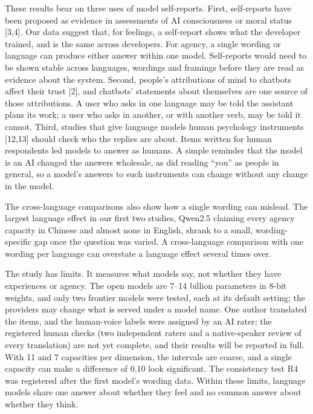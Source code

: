 \documentclass[
  11pt,
]{article}
\begin{document}
These results bear on three uses of model self-reports. First,
self-reports have been proposed as evidence in assessments of AI
consciousness or moral status {[}3,4{]}. Our data suggest that, for
feelings, a self-report shows what the developer trained, and is the
same across developers. For agency, a single wording or language can
produce either answer within one model. Self-reports would need to be
shown stable across languages, wordings and framings before they are
read as evidence about the system. Second, people's attributions of mind
to chatbots affect their trust {[}2{]}, and chatbots' statements about
themselves are one source of those attributions. A user who asks in one
language may be told the assistant plans its work; a user who asks in
another, or with another verb, may be told it cannot. Third, studies
that give language models human psychology instruments {[}12,13{]}
should check who the replies are about. Items written for human
respondents led models to answer as humans. A simple reminder that the
model is an AI changed the answers wholesale, as did reading ``you'' as
people in general, so a model's answers to such instruments can change
without any change in the model.

The cross-language comparisons also show how a single wording can
mislead. The largest language effect in our first two studies, Qwen2.5
claiming every agency capacity in Chinese and almost none in English,
shrank to a small, wording-specific gap once the question was varied. A
cross-language comparison with one wording per language can overstate a
language effect several times over.

The study has limits. It measures what models say, not whether they have
experiences or agency. The open models are 7--14 billion parameters in
8-bit weights, and only two frontier models were tested, each at its
default setting; the providers may change what is served under a model
name. One author translated the items, and the human-voice labels were
assigned by an AI rater; the registered human checks (two independent
raters and a native-speaker review of every translation) are not yet
complete, and their results will be reported in full. With 11 and 7
capacities per dimension, the intervals are coarse, and a single
capacity can make a difference of 0.10 look significant. The consistency
test R4 was registered after the first model's wording data. Within
these limits, language models share one answer about whether they feel
and no common answer about whether they think.
\end{document}

